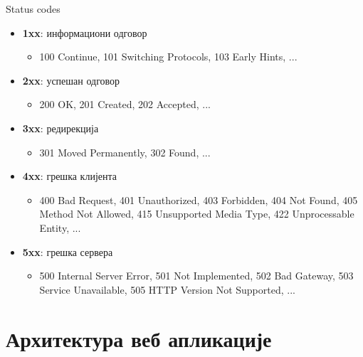 \documentclass{beamer}
\begin{document}
    \begin{frame}{Status codes}
        \begin{itemize}
            \item \textbf{1xx}: информациони одговор
            \begin{itemize}
                \item 100 Continue, 101 Switching Protocols, 103 Early Hints, ...
            \end{itemize}
            \item \textbf{2xx}: успешан одговор
            \begin{itemize}
                \item 200 OK, 201 Created, 202 Accepted, ...
            \end{itemize}
            \item \textbf{3xx}: редирекција
            \begin{itemize}
                \item 301 Moved Permanently, 302 Found, ...
            \end{itemize}
            \item \textbf{4xx}: грешка клијента
            \begin{itemize}
                \item 400 Bad Request, 401 Unauthorized, 403 Forbidden, 404 Not Found, 405 Method Not Allowed, 415 Unsupported Media Type, 422 Unprocessable Entity, ...
            \end{itemize}
            \item \textbf{5xx}: грешка сервера
            \begin{itemize}
                \item 500 Internal Server Error, 501 Not Implemented, 502 Bad Gateway, 503 Service Unavailable, 505 HTTP Version Not Supported, ...
            \end{itemize}
        \end{itemize}
    \end{frame}

    \section{Архитектура веб апликације}
    
\end{document}
